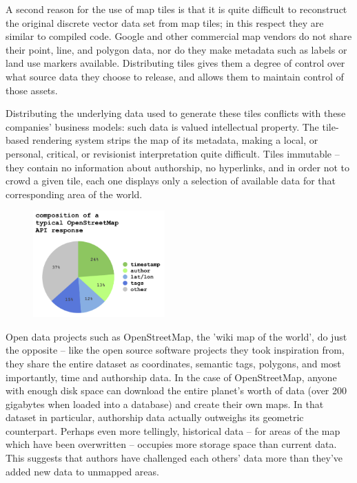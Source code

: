 \documentclass[11pt]{report}
\begin{document}
A second reason for the use of map tiles is that it is quite difficult to reconstruct the original discrete vector data set from map tiles; in this respect they are similar to compiled code. Google and other commercial map vendors do not share their point, line, and polygon data, nor do they make metadata such as labels or land use markers available. Distributing tiles gives them a degree of control over what source data they choose to release, and allows them to maintain control of those assets.

Distributing the underlying data used to generate these tiles conflicts with these companies' business models: such data is valued intellectual property. The tile-based rendering system strips the map of its metadata, making a local, or personal, critical, or revisionist interpretation quite difficult. Tiles immutable – they contain no information about authorship, no hyperlinks, and in order not to crowd a given tile, each one displays only a selection of available data for that corresponding area of the world. 

\begin{figure}
	\begin{flushleft}
		\includegraphics[width=0.45\textwidth]{images/osm-composition.png}
	\end{flushleft}
\end{figure}

Open data projects such as OpenStreetMap, the 'wiki map of the world', do just the opposite – like the open source software projects they took inspiration from, they share the entire dataset as coordinates, semantic tags, polygons, and most importantly, time and authorship data. In the case of OpenStreetMap, anyone with enough disk space can download the entire planet's worth of data (over 200 gigabytes when loaded into a database) and create their own maps. In that dataset in particular, authorship data actually outweighs its geometric counterpart. Perhaps even more tellingly, historical data – for areas of the map which have been overwritten – occupies more storage space than current data. This suggests that authors have challenged each others' data more than they've added new data to unmapped areas. \cite{warren2009composition}
\end{document}
